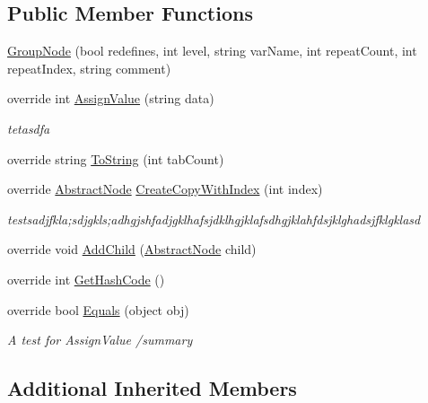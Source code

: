 \subsection*{Public Member Functions}
\begin{DoxyCompactItemize}
\item 
\hyperlink{class__1920_parser_1_1_group_node_a53519a72e3f5194de29b77e51f5df939}{Group\+Node} (bool redefines, int level, string var\+Name, int repeat\+Count, int repeat\+Index, string comment)
\item 
override int \hyperlink{class__1920_parser_1_1_group_node_a27b61720154a26499149966cf22de811}{Assign\+Value} (string data)
\begin{DoxyCompactList}\small\item\em tetasdfa \end{DoxyCompactList}\item 
override string \hyperlink{class__1920_parser_1_1_group_node_a9d5c05eabdd12c9c4ca306cc369d8523}{To\+String} (int tab\+Count)
\item 
override \hyperlink{class__1920_parser_1_1_abstract_node}{Abstract\+Node} \hyperlink{class__1920_parser_1_1_group_node_ab01b00a2bbbef1d565e5ef3e951c4ed6}{Create\+Copy\+With\+Index} (int index)
\begin{DoxyCompactList}\small\item\em testsadjfkla;sdjgkls;adhgjshfadjgklhafsjdklhgjklafsdhgjklahfdsjklghadsjfklgklasd \end{DoxyCompactList}\item 
override void \hyperlink{class__1920_parser_1_1_group_node_a037839ecea0ec7326c6a49e0793bd6c8}{Add\+Child} (\hyperlink{class__1920_parser_1_1_abstract_node}{Abstract\+Node} child)
\item 
override int \hyperlink{class__1920_parser_1_1_group_node_a314c8fb4d4f71b11916df9c822b9442d}{Get\+Hash\+Code} ()
\item 
override bool \hyperlink{class__1920_parser_1_1_group_node_a944b36a0063df009c7f554522f7e38fc}{Equals} (object obj)
\begin{DoxyCompactList}\small\item\em A test for Assign\+Value /summary \end{DoxyCompactList}\end{DoxyCompactItemize}
\subsection*{Additional Inherited Members}


